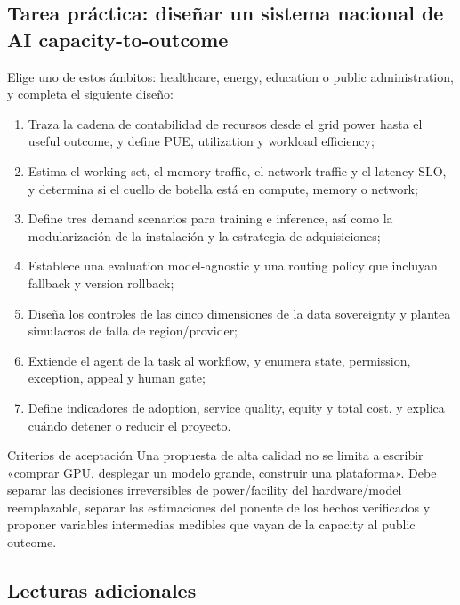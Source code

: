\subsection{Tarea práctica: diseñar un sistema nacional de AI capacity-to-outcome}

Elige uno de estos ámbitos: healthcare, energy, education o public administration, y completa el siguiente diseño:

\begin{enumerate}
  \item Traza la cadena de contabilidad de recursos desde el grid power hasta el useful outcome, y define PUE, utilization y workload efficiency;
  \item Estima el working set, el memory traffic, el network traffic y el latency SLO, y determina si el cuello de botella está en compute, memory o network;
  \item Define tres demand scenarios para training e inference, así como la modularización de la instalación y la estrategia de adquisiciones;
  \item Establece una evaluation model-agnostic y una routing policy que incluyan fallback y version rollback;
  \item Diseña los controles de las cinco dimensiones de la data sovereignty y plantea simulacros de falla de region/provider;
  \item Extiende el agent de la task al workflow, y enumera state, permission, exception, appeal y human gate;
  \item Define indicadores de adoption, service quality, equity y total cost, y explica cuándo detener o reducir el proyecto.
\end{enumerate}

\begin{knowledgebox}{Criterios de aceptación}
Una propuesta de alta calidad no se limita a escribir «comprar GPU, desplegar un modelo grande, construir una plataforma». Debe separar las decisiones irreversibles de power/facility del hardware/model reemplazable, separar las estimaciones del ponente de los hechos verificados y proponer variables intermedias medibles que vayan de la capacity al public outcome.
\end{knowledgebox}

\subsection{Lecturas adicionales}

